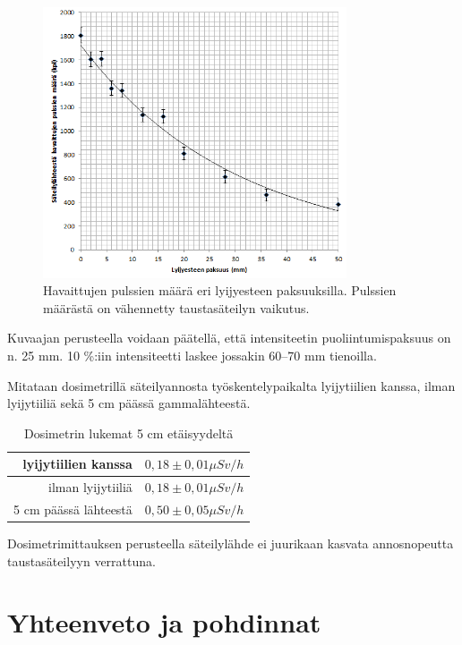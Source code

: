 \documentclass[a4paper,11pt]{article}
\begin{document}
\begin{figure}[H]
\centering \includegraphics[width=0.8\textwidth]{lyijyeste}
\caption{Havaittujen pulssien määrä eri lyijyesteen paksuuksilla. Pulssien määrästä on vähennetty taustasäteilyn vaikutus. \label{lyijyeste}}
\end{figure}

Kuvaajan perusteella voidaan päätellä, että intensiteetin puoliintumispaksuus on n. 25 mm. 10 \%:iin intensiteetti laskee jossakin 60--70 mm tienoilla. 

Mitataan dosimetrillä säteilyannosta työskentelypaikalta lyijytiilien kanssa, ilman lyijytiiliä sekä 5 cm päässä gammalähteestä. 

\begin{table}[H]
\begin{center}
\caption{Dosimetrin lukemat 5 cm etäisyydeltä}
\begin{tabular}{ | r | l | }
  \hline
  lyijytiilien kanssa & $0,18 \pm 0,01 \mu Sv /h$ \\ \hline
  ilman lyijytiiliä & $0,18 \pm 0,01 \mu Sv /h$ \\ \hline
  5 cm päässä lähteestä & $0,50 \pm 0,05 \mu Sv /h$ \\ \hline
\end{tabular}
\end{center}
\end{table}

Dosimetrimittauksen perusteella säteilylähde ei juurikaan kasvata annosnopeutta taustasäteilyyn verrattuna. 

\section{Yhteenveto ja pohdinnat}
\end{document}
